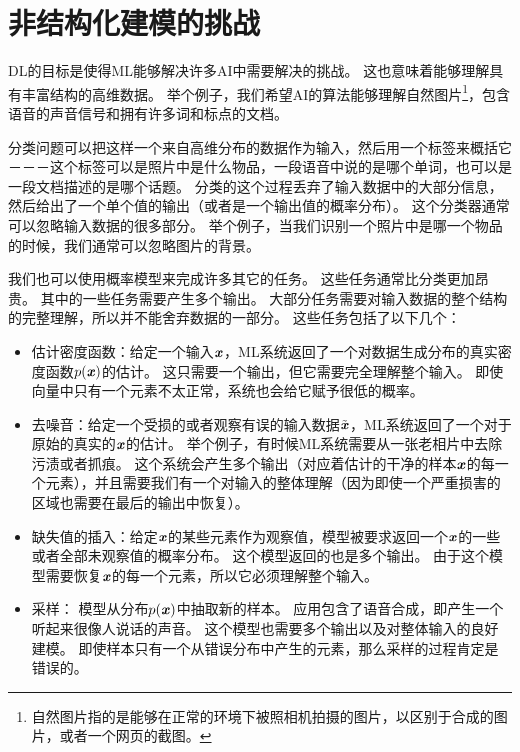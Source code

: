 \section{非结构化建模的挑战}
\label{sec:the_challenge_of_unstructured_modelling}


\gls{DL}的目标是使得\gls{ML}能够解决许多\gls{AI}中需要解决的挑战。
这也意味着能够理解具有丰富结构的高维数据。
举个例子，我们希望\gls{AI}的算法能够理解自然图片\footnote{自然图片指的是能够在正常的环境下被照相机拍摄的图片，以区别于合成的图片，或者一个网页的截图。}，包含语音的声音信号和拥有许多词和标点的文档。


分类问题可以把这样一个来自高维分布的数据作为输入，然后用一个标签来概括它－－－这个标签可以是照片中是什么物品，一段语音中说的是哪个单词，也可以是一段文档描述的是哪个话题。
分类的这个过程丢弃了输入数据中的大部分信息，然后给出了一个单个值的输出（或者是一个输出值的概率分布）。
这个分类器通常可以忽略输入数据的很多部分。
举个例子，当我们识别一个照片中是哪一个物品的时候，我们通常可以忽略图片的背景。


我们也可以使用概率模型来完成许多其它的任务。
这些任务通常比分类更加昂贵。
其中的一些任务需要产生多个输出。
大部分任务需要对输入数据的整个结构的完整理解，所以并不能舍弃数据的一部分。
这些任务包括了以下几个：
\begin{itemize}
	\item 估计密度函数：给定一个输入$\boldsymbol{\mathit{x}}$，\gls{ML}系统返回了一个对数据生成分布的真实密度函数$p(\boldsymbol{\mathit{x}})$的估计。
	这只需要一个输出，但它需要完全理解整个输入。
	即使向量中只有一个元素不太正常，系统也会给它赋予很低的概率。
	
	
	\item 去噪音：给定一个受损的或者观察有误的输入数据$\tilde{\boldsymbol{\mathit{x}}}$，\gls{ML}系统返回了一个对于原始的真实的$\boldsymbol{\mathit{x}}$的估计。
	举个例子，有时候\gls{ML}系统需要从一张老相片中去除污渍或者抓痕。
	这个系统会产生多个输出（对应着估计的干净的样本$\boldsymbol{\mathit{x}}$的每一个元素），并且需要我们有一个对输入的整体理解（因为即使一个严重损害的区域也需要在最后的输出中恢复）。
	
	\item 缺失值的插入：给定$\boldsymbol{\mathit{x}}$的某些元素作为观察值，模型被要求返回一个$\boldsymbol{\mathit{x}}$的一些或者全部未观察值的概率分布。
	这个模型返回的也是多个输出。
	由于这个模型需要恢复$\boldsymbol{\mathit{x}}$的每一个元素，所以它必须理解整个输入。
	
	\item 采样： 模型从分布$p(\boldsymbol{\mathit{x}})$中抽取新的样本。
	应用包含了语音合成，即产生一个听起来很像人说话的声音。
	这个模型也需要多个输出以及对整体输入的良好建模。
	即使样本只有一个从错误分布中产生的元素，那么采样的过程肯定是错误的。 
\end{itemize}

